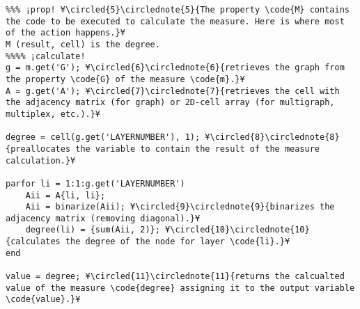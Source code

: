 \documentclass{tufte-handout}
\begin{document}
\begin{lstlisting}
%%% ¡prop! ¥\circled{5}\circlednote{5}{The property \code{M} contains the code to be executed to calculate the measure. Here is where most of the action happens.}¥
M (result, cell) is the degree.
%%%% ¡calculate!
g = m.get('G'); ¥\circled{6}\circlednote{6}{retrieves the graph from the property \code{G} of the measure \code{m}.}¥
A = g.get('A'); ¥\circled{7}\circlednote{7}{retrieves the cell with the adjacency matrix (for graph) or 2D-cell array (for multigraph, multiplex, etc.).}¥

degree = cell(g.get('LAYERNUMBER'), 1); ¥\circled{8}\circlednote{8}{preallocates the variable to contain the result of the measure calculation.}¥

parfor li = 1:1:g.get('LAYERNUMBER')
    Aii = A{li, li};
    Aii = binarize(Aii); ¥\circled{9}\circlednote{9}{binarizes the adjacency matrix (removing diagonal).}¥
    degree(li) = {sum(Aii, 2)}; ¥\circled{10}\circlednote{10}{calculates the degree of the node for layer \code{li}.}¥
end

value = degree; ¥\circled{11}\circlednote{11}{returns the calcualted value of the measure \code{degree} assigning it to the output variable \code{value}.}¥
\end{lstlisting}

%
%
%
%
%
%
%
\end{document}
